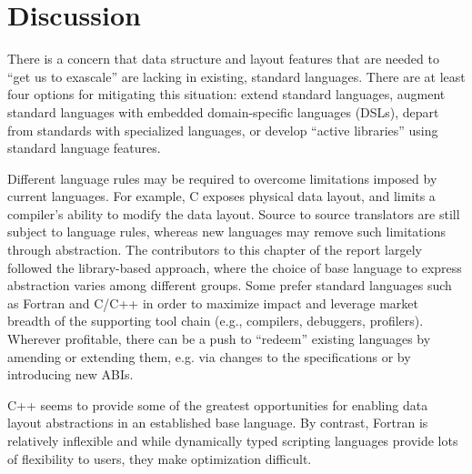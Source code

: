 

\section{Discussion}

There is a concern that data structure and layout features that are needed to ``get us to
exascale'' are lacking in existing, standard languages.  There are at
least four options for mitigating this situation: extend standard languages,
augment standard languages with embedded domain-specific languages (DSLs), 
depart from standards with specialized languages, or develop ``active libraries'' using standard language features. 

Different language rules may be required to overcome limitations imposed by current
languages. For example, C exposes physical data layout, and limits a
compiler's ability to modify the data layout. Source to source
translators are still subject to language rules, whereas new languages
may remove such limitations through abstraction.  The contributors to this chapter of the report largely followed the library-based approach, where the choice of base language to express abstraction varies among different groups. Some prefer standard languages such as Fortran and C/C++ in order to maximize impact and leverage market breadth of the
supporting tool chain (e.g., compilers, debuggers, profilers).
Wherever profitable, there can be a push to ``redeem'' existing
languages by amending or extending them, e.g. via changes to the
specifications or by introducing new ABIs. 

C++ seems to provide some of the greatest opportunities for enabling
data layout abstractions in an established base language. By contrast,
Fortran is relatively inflexible and while dynamically typed scripting
languages provide lots of flexibility to users, they make optimization
difficult.

